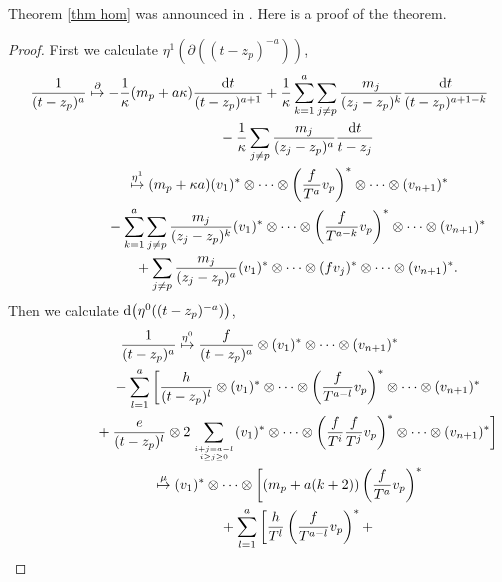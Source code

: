 \documentclass[pdftex]{sigma}
\numberwithin{equation}{section}
\begin{document}
Theorem \ref{thm hom} was announced in \cite{SV2}. Here is a proof of the theorem.

\begin{proof} First we calculate $ \eta^1(\partial((t-z_p)^{-a}))$,
\begin{gather*}
\frac 1{(t-z_p)^{a}} \overset{\partial} \mapsto -\frac{1}{\kappa}(m_p+a\kappa) \frac{{\rm d}t}{(t-z_p)^{a+1}} +\frac{1}{\kappa} \sum_{k=1}^a \sum_{j\neq p}\frac{m_j}{(z_j-z_p)^k}
\frac{{\rm d}t}{(t-z_p)^{a+1-k}} \nonumber \\
\hphantom{\frac 1{(t-z_p)^{a}} \overset{\partial} \mapsto}{} - \frac{1}{\kappa} \sum_{j\neq p} \frac{m_j}{(z_j-z_p)^a}\frac{{\rm d}t}{t-z_j} \nonumber \\
\hphantom{\frac 1{(t-z_p)^{a}}}{}\overset{\eta^1} \mapsto (m_p+\kappa a) (v_1)^* \otimes\dots\otimes\left(\frac{f}{T^a}v_p \right)^* \otimes\dots\otimes (v_{n+1})^* \nonumber \\
\hphantom{\frac 1{(t-z_p)^{a}} \overset{\partial} \mapsto}{} - \sum_{k=1}^a \sum_{j \neq p}\frac{ m_j}{(z_j-z_p)^k} (v_1)^* \otimes\dots\otimes \left(\frac{f}{T^{a-k}} v_p \right)^* \otimes\dots\otimes (v_{n+1})^* \nonumber\\
\hphantom{\frac 1{(t-z_p)^{a}} \overset{\partial} \mapsto}{} + \sum_{j\neq p}\frac{ m_j}{(z_j-z_p)^a} (v_1)^* \otimes\dots\otimes (fv_j)^* \otimes\dots\otimes (v_{n+1})^*. \nonumber
\end{gather*}
Then we calculate ${\rm d}\big(\eta^0((t-z_p)^{-a})\big)$,
\begin{gather*}
\frac1{(t-z_p)^{a}} \overset{\eta^0}\mapsto \frac{f}{(t-z_p)^a} \otimes (v_1)^* \otimes\dots\otimes (v_{n+1})^* \nonumber \\
\hphantom{\frac1{(t-z_p)^{a}} \overset{\eta^0}\mapsto}{} - \sum_{l=1}^a \bigg[ \frac{h}{(t-z_p)^l} \otimes (v_1)^* \otimes\dots\otimes \left( \frac{f}{T^{a-l}} v_p \right)^* \otimes\dots\otimes (v_{n+1})^*
\nonumber \\
\hphantom{\frac1{(t-z_p)^{a}} \overset{\eta^0}\mapsto}{} + \frac{e}{(t-z_p)^l} \otimes 2 \sum_{i+j = a-l \atop i \geq j \geq 0} (v_1)^* \otimes\dots\otimes \left(\frac{f}{T^i} \frac{f}{T^j} v_p \right)^* \otimes\dots\otimes (v_{n+1})^* \bigg] \nonumber \\
\hphantom{\frac1{(t-z_p)^{a}}}{}
\overset{\mu} \mapsto (v_1)^* \otimes\dots\otimes \bigg[ (m_p + a(k+2)) \left(\frac{f}{T^a} v_p \right)^* \nonumber \\
\hphantom{\frac1{(t-z_p)^{a}} \overset{\eta^0}\mapsto}{} + \sum_{l=1}^a \bigg[\frac{h}{T^l}\left(\frac{f}{T^{a-l}}v_p\right)^*+

\end{gather*}
\end{proof}
\end{document}
